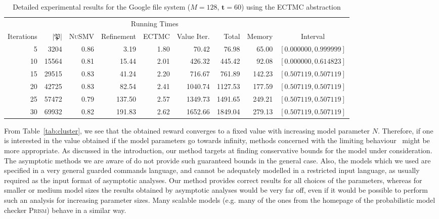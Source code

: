 \documentclass[10pt,twocolumn]{article}
\newcommand{\PRISM}{\textsc{Prism}\xspace}
\newcommand{\NUSMV}{\textsc{NuSMV}\xspace}
\newcommand{\timeb}{\mathbf{t}}
\newcommand{\apart}{\mathfrak{P}}
\begin{document}
\begin{table*}[tb]
  \centering
  \caption{Detailed experimental results for the Google file system ($M=128$, $\timeb=60$) using the ECTMC abstraction}
  \label{tab:google_detailed_cmc}
\begin{tabular}{|rr|rrrrr|r|c|}
  \hline
               &                & \multicolumn{5}{c|}{Running Times} & &  \\
  Iterations & $ |\apart|$ & \NUSMV & Refinement & ECTMC & Value Iter. & Total & Memory & Interval \\
  \hline
  5 & 3204 & 0.86 & 3.19 & 1.80 & 70.42 & 76.98 & 65.00 & $[0.000000, 0.999999]$ \\
  10 & 15564 & 0.81 & 15.44 & 2.01 & 426.32 & 445.42 & 92.08 & $[0.000000, 0.614823]$ \\
  15 & 29515 & 0.83 & 41.24 & 2.20 & 716.67 & 761.89 & 142.23 & $[0.507119, 0.507119]$ \\
  20 & 42725 & 0.83 & 82.54 & 2.41 & 1040.74 & 1127.53 & 177.59 & $[0.507119, 0.507119]$ \\
  25 & 57472 & 0.79 & 137.50 & 2.57 & 1349.73 & 1491.65 & 249.21 & $[0.507119, 0.507119]$ \\
  30 & 69932 & 0.82 & 191.83 & 2.62 & 1652.66 & 1849.04 & 279.13 & $[0.507119, 0.507119]$ \\
  \hline
\end{tabular}
\end{table*}

From Table~\ref{tab:cluster}, we see that the obtained reward converges to a fixed value with increasing model parameter $N$.
Therefore, if one is interested in the value obtained if the model parameters go towards infinity, methods concerned with the limiting behaviour~\cite{BortolussiH12,BortolussiH13,HenzingerMMW10,AngiusHW13} might be more appropriate.
As discussed in the introduction, our method targets at finding conservative bounds for the model under consideration.
The asymptotic methods we are aware of do not provide such guaranteed bounds in the general case.
Also, the models which we used are specified in a very general guarded commands language, and cannot be adequately modelled in a restricted input language, as usually required as the input format of asymptotic analyses.
Our method provides correct results for all choices of the parameters, whereas for smaller or medium model sizes the results obtained by asymptotic analyses would be very far off, even if it would be possible to perform such an analysis for increasing parameter sizes.
Many scalable models (e.g. many of the ones from the homepage of the probabilistic model checker \PRISM) behave in a similar way.
\end{document}
